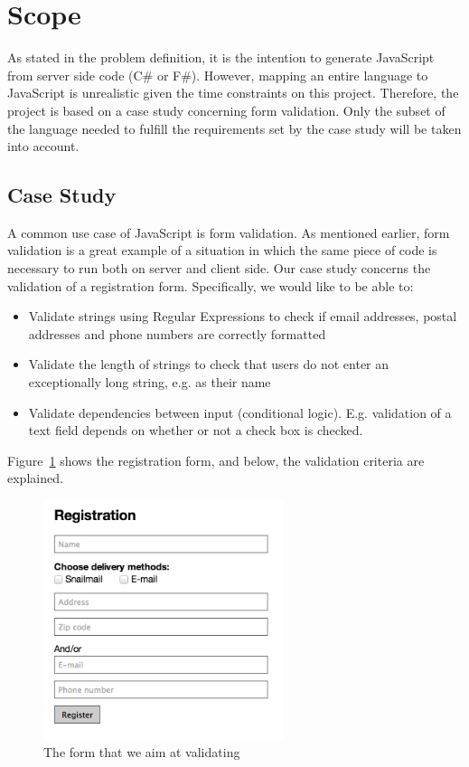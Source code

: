 \section{Scope}
	As stated in the problem definition, it is the intention to generate JavaScript from server side code (C\# or F\#). However, mapping an entire language to JavaScript is unrealistic given the time constraints on this project. Therefore, the project is based on a case study concerning form validation. Only the subset of the language needed to fulfill the requirements set by the case study will be taken into account.

	\subsection{Case Study}
		A common use case of JavaScript is form validation. As mentioned earlier, form validation is a great example of a situation in which the same piece of code is necessary to run both on server and client side. Our case study concerns the validation of a registration form. Specifically, we would like to be able to:

		\begin{itemize}
			\item Validate strings using Regular Expressions to check if email addresses, postal addresses and phone numbers are correctly formatted
			\item Validate the length of strings to check that users do not enter an exceptionally long string, e.g. as their name
			\item Validate dependencies between input (conditional logic). E.g. validation of a text field depends on whether or not a check box is checked.
		\end{itemize}

		Figure~\ref{registrationForm} shows the registration form, and below, the validation criteria are explained.

		\begin{figure}
			\begin{center}
				\centerline{\includegraphics[width=7cm]{resources/images/registrationform.png}}
			\end{center}
			\caption{The form that we aim at validating}
			\label{registrationForm}
		\end{figure}


